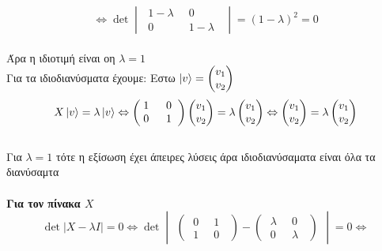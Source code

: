 \documentclass[12pt]{article}
\begin{document}
$$ \Leftrightarrow\det \begin{vmatrix}\;1-\lambda \;\; & 0 \;\;\\ \;0 \;\; & 1-\lambda \;\;\end{vmatrix} = (1-\lambda)^2 =0 $$ \\
Άρα η ιδιοτιμή είναι οη $\lambda = 1$  \\
Για τα ιδιοδιανύσματα έχουμε:
Εστω $\ket{v}=\begin{pmatrix} v_1 \\ v_2\end{pmatrix}$
$$X\ket{v}=\lambda\ket{ v} \Leftrightarrow \begin{pmatrix}\;1 \;\; & 0 \;\;\\ \;0 \;\; & 1 \;\;\end{pmatrix}\begin{pmatrix} v_1 \\ v_2\end{pmatrix}=\lambda\begin{pmatrix} v_1 \\ v_2\end{pmatrix} \Leftrightarrow 
\begin{pmatrix} v_1 \\ v_2\end{pmatrix} = \lambda \begin{pmatrix} v_1 \\ v_2\end{pmatrix}$$\\
Για $\lambda =1 $ τότε η εξίσωση έχει άπειρες λύσεις άρα ιδιοδιανύσαματα είναι όλα τα διανύσαμτα\\ \\
{\bf Για τον πίνακα $X$}\\


$$ \det |X-\lambda I| = 0 \Leftrightarrow \det \begin{vmatrix}\begin{pmatrix}\;0 \;\; & 1 \;\;\\ \;1 \;\; & 0 \;\;\end{pmatrix} -\begin{pmatrix}\;\lambda \;\; & 0 \;\;\\\;0 \;\; & \lambda \;\;\end{pmatrix}\end{vmatrix}  =0 \Leftrightarrow$$
\end{document}
